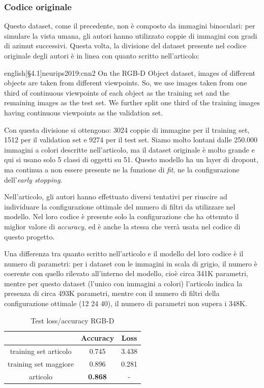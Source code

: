 \documentclass[italian,12pt,a4paper,oneside,final]{report}
\begin{document}
\subsubsection{Codice originale}
Questo dataset, come il precedente, non è composto da immagini binoculari: per simulare la vista umana, gli autori hanno utilizzato coppie di immagini con gradi di azimut successivi.
Questa volta, la divisione del dataset presente nel codice originale degli autori è in linea con quanto scritto nell'articolo:
\begin{foreigndisplaycquote}{english}[\S4.1]{neurips2019:cnn2}
	On the RGB-D Object dataset, images of different objects are taken from different viewpoints. So, we use images taken from one third of continuous viewpoints of each object as the training set and the remaining images as the test set. We further split one third of the training images having continuous viewpoints as the validation set.
\end{foreigndisplaycquote}
Con questa divisione si ottengono: 3024 coppie di immagine per il training set, 1512 per il validation set e 9274 per il test set.
Siamo molto lontani dalle 250.000 immagini a colori descritte nell'articolo, ma il dataset originale è molto grande e qui si usano solo 5 classi di oggetti su 51.
Questo modello ha un layer di dropout, ma continua a non essere presente ne la funzione di \textit{fit}, ne la configurazione dell'\textit{early stopping}.

Nell'articolo, gli autori hanno effettuato diversi tentativi per riuscire ad individuare la configurazione ottimale del numero di filtri da utilizzare nel modello.
Nel loro codice è presente solo la configurazione che ha ottenuto il miglior valore di \textit{accuracy}, ed è anche la stessa che verrà usata nel codice di questo progetto.

Una differenza tra quanto scritto nell'articolo e il modello del loro codice è il numero di parametri: per i dataset con le immagini in scala di grigio, il numero è coerente con quello rilevato all'interno del modello, cioè circa 341K parametri, mentre per questo dataset (l'unico con immagini a colori) l'articolo indica la presenza di circa 493K parametri, mentre con il numero di filtri della configurazione ottimale (12 24 40), il numero di parametri non supera i 348K.
\begin{table}[!ht]
	\centering
	\begin{tabular}[t]{|c|cc|}
		\hline
		& \textbf{Accuracy} & \textbf{Loss} \\
		\hline
		training set articolo& 0.745 & 3.438 \\
		training set maggiore& 0.896 & 0.281 \\
		articolo & \textbf{0.868} & - \\
		\hline
	\end{tabular}
	\caption{Test loss/accuracy RGB-D}
	\label{tab:rgbd_val_loss_acc_pt}
\end{table}
\end{document}
